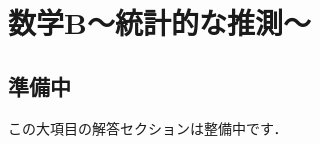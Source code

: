\documentclass[../../ms_a.tex]{subfiles}
\begin{document}
\section{数学B～統計的な推測～}

\subsection*{準備中}
この大項目の解答セクションは整備中です．
\end{document}
